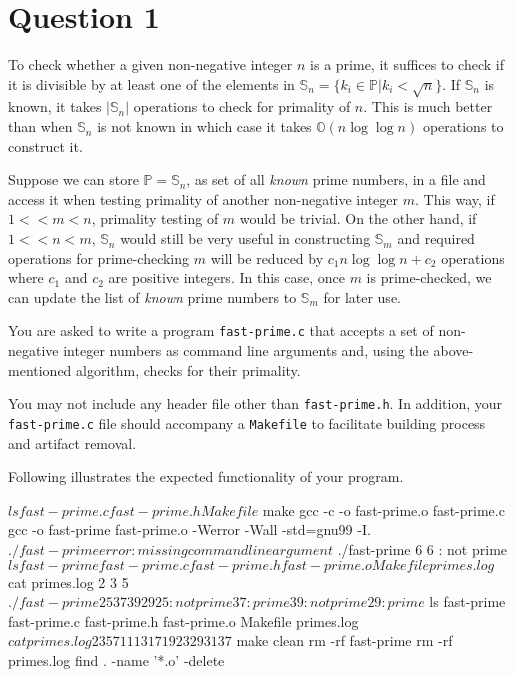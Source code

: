 \documentclass[12pt,letterpaper,twoside]{article}
\begin{document}


\section*{Question 1}

To check whether a given non-negative integer $n$ is a prime, it suffices to check if it is divisible by at least one of the elements in $\mathbb{S}_n =  \{ k_i \in \mathbb{P} | k_i < \sqrt{n} \}$.
If $\mathbb{S}_n$ is known, it takes $|\mathbb{S}_n|$ operations to check for primality of $n$.
This is much better than when $\mathbb{S}_n$ is not known in which case it takes $\mathbb{O}(n \log \log n)$ operations to construct it.

Suppose we can store $\mathbb{P} = \mathbb{S}_n$, as set of all \textit{known} prime numbers, in a file and access it when testing primality of another non-negative integer $m$.
This way, if $1 << m < n$, primality testing of $m$ would be trivial.
On the other hand, if $1 << n < m$, $\mathbb{S}_n$ would still be very useful in constructing $\mathbb{S}_m$ and required operations for prime-checking $m$ will be reduced by $c_1 n \log \log n + c_2$ operations where $c_1$ and $c_2$ are positive integers.
In this case, once $m$ is prime-checked, we can update the list of \textit{known} prime numbers to $\mathbb{S}_m$ for later use.

You are asked to write a program \texttt{fast-prime.c} that accepts a set of non-negative integer numbers as command line arguments and, using the above-mentioned algorithm, checks for their primality.

You may not include any header file other than \texttt{fast-prime.h}.
In addition, your \texttt{fast-prime.c} file should accompany a \texttt{Makefile} to facilitate building process and artifact removal.

Following illustrates the expected functionality of your program.

\newpage

\begin{terminal}
$ ls
fast-prime.c fast-prime.h Makefile
$ make
gcc -c -o fast-prime.o fast-prime.c
gcc -o fast-prime fast-prime.o -Werror -Wall -std=gnu99 -I.
$ ./fast-prime
error: missing command line argument
$ ./fast-prime 6
6     : not prime
$ ls
fast-prime fast-prime.c fast-prime.h fast-prime.o
Makefile primes.log
$ cat primes.log
2
3
5
$ ./fast-prime 25 37 39 29
25    : not prime
37    : prime
39    : not prime
29    : prime
$ ls
fast-prime fast-prime.c fast-prime.h fast-prime.o Makefile primes.log
$ cat primes.log
2
3
5
7
11
13
17
19
23
29
31
37
$ make clean
rm -rf fast-prime
rm -rf primes.log
find . -name '*.o' -delete
\end{terminal}

\end{document}

